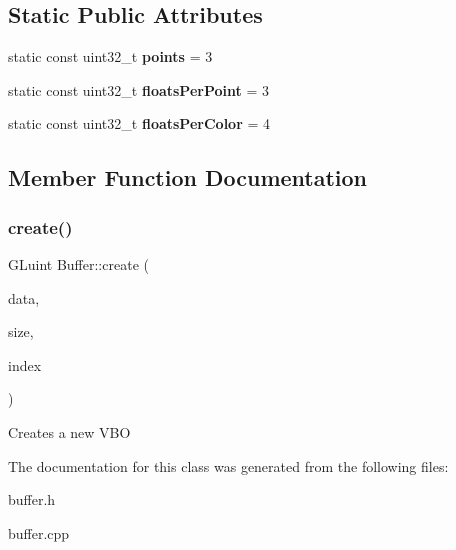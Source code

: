 \subsection*{Static Public Attributes}
\begin{DoxyCompactItemize}
\item 
\mbox{\label{classBuffer_a6698784d8c411d267b41783b9afb53f8}} 
static const uint32\+\_\+t {\bfseries points} = 3
\item 
\mbox{\label{classBuffer_a98e73097c322154a3decd3ffc2b23122}} 
static const uint32\+\_\+t {\bfseries floats\+Per\+Point} = 3
\item 
\mbox{\label{classBuffer_a2ee60c81acd03236c4239dd6f1402212}} 
static const uint32\+\_\+t {\bfseries floats\+Per\+Color} = 4
\end{DoxyCompactItemize}


\subsection{Member Function Documentation}
\mbox{\label{classBuffer_a6fc374a8a64e465f1d89a0231db21387}} 
\subsubsection{\texorpdfstring{create()}{create()}}
{\footnotesize\ttfamily G\+Luint Buffer\+::create (\begin{DoxyParamCaption}\item[{const G\+Lfloat $\ast$}]{data,  }\item[{int}]{size,  }\item[{G\+Luint}]{index }\end{DoxyParamCaption})}

Creates a new V\+BO 

The documentation for this class was generated from the following files\+:\begin{DoxyCompactItemize}
\item 
buffer.\+h\item 
buffer.\+cpp\end{DoxyCompactItemize}
